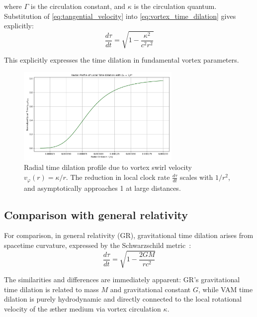 where $\Gamma$ is the circulation constant, and $\kappa$ is the circulation quantum. Substitution of \eqref{eq:tangential_velocity} into \eqref{eq:vortex_time_dilation} gives explicitly:
\begin{equation}\label{eq:vortex_time_explicit}
\frac{d\tau}{dt} = \sqrt{1 - \frac{\kappa^2}{c^2 r^2}}
\end{equation}

This explicitly expresses the time dilation in fundamental vortex parameters.

\begin{figure}[H]
  \centering
  \includegraphics[width=0.7\textwidth]{02-RadialProfileOfLocalTimeDilation_Radial_LocalTime_Dilation}
  \caption{Radial time dilation profile due to vortex swirl velocity \( v_\varphi(r) = \kappa / r \). The reduction in local clock rate \(\frac{d\tau}{dt}\) scales with \(1/r^2\), and asymptotically approaches 1 at large distances.}
  \label{fig:radial_time_dilation}
\end{figure}

\subsection{Comparison with general relativity}

For comparison, in general relativity (GR), gravitational time dilation arises from spacetime curvature, expressed by the Schwarzschild metric~\cite{schutz2009first}:
\begin{equation}\label{eq:GRtime}
\frac{d\tau}{dt} = \sqrt{1 - \frac{2GM}{rc^2}}
\end{equation}

The similarities and differences are immediately apparent: GR's gravitational time dilation is related to mass $M$ and gravitational constant $G$, while VAM time dilation is purely hydrodynamic and directly connected to the local rotational velocity of the æther medium via vortex circulation $\kappa$.

